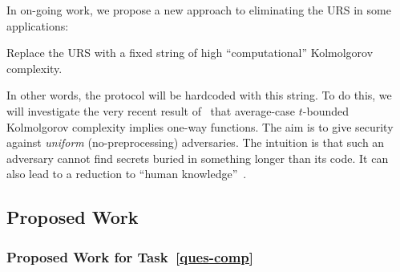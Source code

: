  
 
 In on-going work, we propose a new approach to eliminating the URS in some applications:
 
 \begin{idea} \label{idea-kol}
Replace the URS with a fixed string of high ``computational'' Kolmolgorov complexity.  
 \end{idea} 
 
 In other words, the protocol will be hardcoded with this string.
 To do this, we will investigate the very recent result of~\cite{FOCS:LiuPas20} that average-case $t$-bounded Kolmolgorov complexity implies one-way functions.   The aim is to give  security against \emph{uniform} (no-preprocessing) adversaries. The intuition is that such an adversary cannot  find secrets buried in something longer than its code.  It can also lead to a reduction to ``human knowledge''~\cite{VIETCRYPT:Rogaway06,TCC:BBKPV16}.


 

\subsection*{Proposed Work}

\subsubsection{Proposed Work for Task~\ref{ques-comp}}



